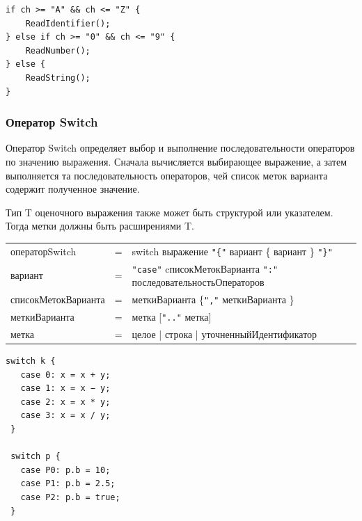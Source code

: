 \documentclass[a4paper,12pt]{article}
\newcommand{\lit}[1]{\texttt{"#1"}}
\begin{document}
    \begin{center}
        \begin{minipage}[t]{0.5\textwidth}
            \begin{lstlisting}[style=obouldstyle]
if ch >= "A" && ch <= "Z" {
    ReadIdentifier();
} else if ch >= "0" && ch <= "9" {
    ReadNumber();
} else {
    ReadString();
}

            \end{lstlisting}
        \end{minipage}
    \end{center}

    \subsubsection*{Оператор Switch}

    Оператор Switch определяет выбор и выполнение последовательности операторов по значению выражения. Сначала вычисляется выбирающее выражение, а затем выполняется та последовательность операторов, чей список меток варианта содержит полученное значение.

    Тип T оценочного выражения также может быть структурой или указателем. Тогда метки должны быть расширениями T.

    \begin{center}
        \begin{tabular}{l c l}
            операторSwitch & = & switch выражение \lit{\{} вариант \{ вариант \} \lit{\}} \\
            вариант & = & \lit{case} cписокМетокВарианта \lit{:} последовательностьОператоров \\
            списокМетокВарианта & = & меткиВарианта \{\lit{,} меткиВарианта \} \\
            меткиВарианта & = & метка [\lit{..} метка] \\
            метка & = & целое | строка | уточненныйИдентификатор
        \end{tabular}
    \end{center}

    \begin{center}
        \begin{minipage}[t]{0.5\textwidth}
            \begin{lstlisting}[style=obouldstyle]
switch k {
   case 0: x = x + y;
   case 1: x = x − y;
   case 2: x = x * y;
   case 3: x = x / y;
 }

 switch p {
   case P0: p.b = 10;
   case P1: p.b = 2.5;
   case P2: p.b = true;
 }

            \end{lstlisting}
        \end{minipage}
    \end{center}
\end{document}
